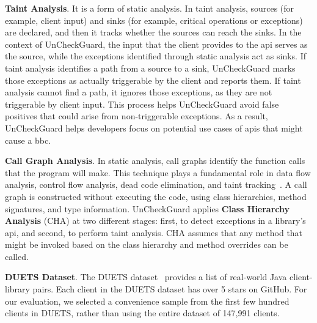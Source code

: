 \textbf{Taint Analysis}. It is a form of static analysis. In taint analysis, sources (for example, client input) and sinks (for example, critical operations or exceptions) are declared, and then it tracks whether the sources can reach the sinks. In the context of UnCheckGuard, the input that the client provides to the \gls{api} serves as the source, while the exceptions identified through static analysis act as sinks.  If taint analysis identifies a path from a source to a sink, UnCheckGuard marks those exceptions as actually triggerable by the client and reports them.  If taint analysis cannot find a path, it ignores those exceptions, as they are not triggerable by client input.  This process helps UnCheckGuard avoid false positives that could arise from non-triggerable exceptions.  As a result, UnCheckGuard helps developers focus on potential use cases of \gls{api}s that might cause a \gls{bbc}.

\textbf{Call Graph Analysis}. In static analysis, call graphs identify the function calls that the program will make. This technique plays a fundamental role in data flow analysis, control flow analysis, dead code elimination, and taint tracking~\cite{Keshani2024}. A call graph is constructed without executing the code, using class hierarchies, method signatures, and type information. UnCheckGuard applies \textbf{Class Hierarchy Analysis} (CHA) at two different stages: first, to detect exceptions in a library’s \gls{api}, and second, to perform taint analysis. CHA assumes that any method that might be invoked based on the class hierarchy and method overrides can be called.

\textbf{DUETS Dataset}. The DUETS dataset~\cite{durieux21:_duets} provides a list of real-world Java client-library pairs. Each client in the DUETS dataset has over 5 stars on GitHub. For our evaluation, we selected a convenience sample from the first few hundred clients in DUETS, rather than using the entire dataset of 147,991 clients.